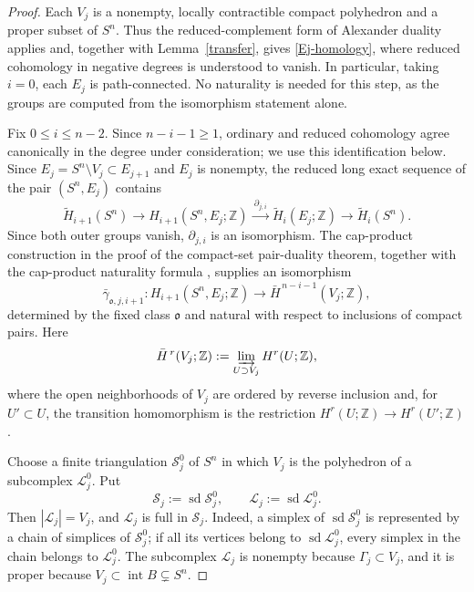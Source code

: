 \documentclass[12pt,oneside,a4paper]{article}
\theoremstyle{mytheorem}
\theoremstyle{remark}
\theoremstyle{definition}
\begin{document}
\begin{proof}
Each $V_j$ is a nonempty, locally contractible compact polyhedron and a
proper subset of $S^n$.  Thus the reduced-complement form of Alexander
duality \cite[Corollary~3.45]{zbMATH02103273} applies and, together with
Lemma~\ref{transfer}, gives
\eqref{Ej-homology}, where reduced cohomology in negative degrees is
understood to vanish.  In particular, taking $i=0$, each $E_j$ is
path-connected.  No naturality is needed for this step, as the groups are
computed from the isomorphism statement alone.

Fix $0\leq i\leq n-2$.  Since $n-i-1\geq1$, ordinary and reduced
cohomology agree canonically in the degree under consideration; we use
this identification below.  Since
$E_j=S^n\setminus V_j\subset E_{j+1}$ and $E_j$ is nonempty, the reduced
long exact sequence of the pair $(S^n,E_j)$ contains
\[
\widetilde H_{i+1}(S^n)\longrightarrow
H_{i+1}(S^n,E_j;\mathbb Z)
\xrightarrow{\ \partial_{j,i}\ }
\widetilde H_i(E_j;\mathbb Z)\longrightarrow
\widetilde H_i(S^n).
\]
Since both outer groups vanish, $\partial_{j,i}$ is an isomorphism.  The
cap-product construction in the proof of the compact-set pair-duality
theorem, together with the cap-product naturality formula
\cite[proof of Theorem~3.44 and pp.~248--249]{zbMATH02103273},
supplies an isomorphism
\[
\bar\gamma_{\mathfrak o,j,i+1}:
H_{i+1}(S^n,E_j;\mathbb Z)
\longrightarrow
\bar H^{\,n-i-1}(V_j;\mathbb Z),
\]
determined by the fixed class $\mathfrak o$ and natural with respect to
inclusions of compact pairs.  Here
\[
 \bar H^{\,r}(V_j;\mathbb Z)
 :=\varinjlim_{U\supset V_j}H^r(U;\mathbb Z),
\]
where the open neighborhoods of $V_j$ are ordered by reverse
inclusion and, for $U'\subset U$, the transition homomorphism is the
restriction $H^r(U;\mathbb Z)\to H^r(U';\mathbb Z)$.

Choose a finite triangulation $\mathcal S_j^0$ of $S^n$ in which $V_j$ is the
polyhedron of a subcomplex $\mathcal{L}_j^0$.  Put
\[
 \mathcal S_j:=\operatorname{sd}\mathcal S_j^0,
 \qquad
 \mathcal{L}_j:=\operatorname{sd}\mathcal{L}_j^0.
\]
Then $|\mathcal{L}_j|=V_j$, and $\mathcal{L}_j$ is full in $\mathcal S_j$.
Indeed, a simplex of $\operatorname{sd}\mathcal S_j^0$ is represented by a
chain of simplices of $\mathcal S_j^0$; if all its vertices belong to
$\operatorname{sd}\mathcal{L}_j^0$, every simplex in the chain belongs
to $\mathcal{L}_j^0$.  The subcomplex $\mathcal{L}_j$ is nonempty
because $\Gamma_j\subset V_j$, and it is proper because
$V_j\subset\operatorname{int}B\subsetneq S^n$.


\end{proof}
\end{document}
